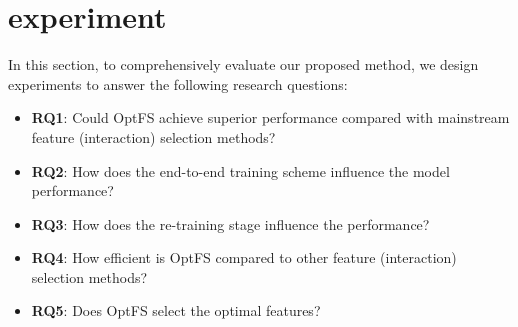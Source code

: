 \documentclass[sigconf]{acmart}
\begin{document}
 \section{experiment}
\label{sec:experiment}

In this section, to comprehensively evaluate our proposed method, we design experiments to answer the following research questions: 

\begin{itemize}[topsep=0pt,noitemsep,nolistsep,leftmargin=*]
\item \textbf{RQ1}: Could OptFS achieve superior performance compared with mainstream feature (interaction) selection methods?
    \item \textbf{RQ2}: How does the end-to-end training scheme influence the model performance?
    \item \textbf{RQ3}: How does the re-training stage influence the performance?
\item \textbf{RQ4}: How efficient is OptFS compared to other feature (interaction) selection methods?
\item \textbf{RQ5}: Does OptFS select the optimal features?
\end{itemize}
\end{document}
